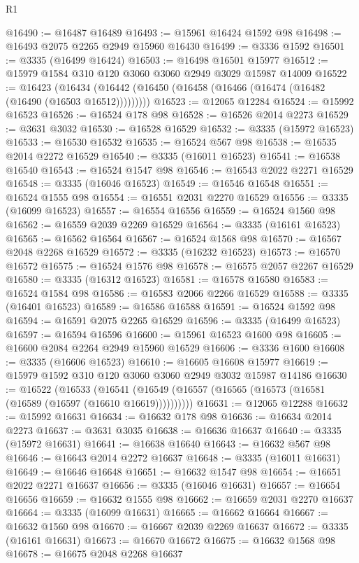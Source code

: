 \begin{lexlean}{R1}
\begin{coremodule}
@16490 := @16487 @16489
@16493 := @15961 @16424 @1592 @98
@16498 := @16493 @2075 @2265 @2949 @15960 @16430
@16499 := @3336 @1592
@16501 := @3335 (@16499 @16424)
@16503 := @16498 @16501 @15977
@16512 := @15979 @1584 @310 @120 @3060 @3060 @2949 @3029 @15987 @14009
@16522 := @16423
    (@16434 (@16442 (@16450 (@16458 (@16466 (@16474 (@16482 (@16490 (@16503 @16512)))))))))
@16523 := @12065 @12284
@16524 := @15992 @16523
@16526 := @16524 @178 @98
@16528 := @16526 @2014 @2273
@16529 := @3631 @3032
@16530 := @16528 @16529
@16532 := @3335 (@15972 @16523)
@16533 := @16530 @16532
@16535 := @16524 @567 @98
@16538 := @16535 @2014 @2272 @16529
@16540 := @3335 (@16011 @16523)
@16541 := @16538 @16540
@16543 := @16524 @1547 @98
@16546 := @16543 @2022 @2271 @16529
@16548 := @3335 (@16046 @16523)
@16549 := @16546 @16548
@16551 := @16524 @1555 @98
@16554 := @16551 @2031 @2270 @16529
@16556 := @3335 (@16099 @16523)
@16557 := @16554 @16556
@16559 := @16524 @1560 @98
@16562 := @16559 @2039 @2269 @16529
@16564 := @3335 (@16161 @16523)
@16565 := @16562 @16564
@16567 := @16524 @1568 @98
@16570 := @16567 @2048 @2268 @16529
@16572 := @3335 (@16232 @16523)
@16573 := @16570 @16572
@16575 := @16524 @1576 @98
@16578 := @16575 @2057 @2267 @16529
@16580 := @3335 (@16312 @16523)
@16581 := @16578 @16580
@16583 := @16524 @1584 @98
@16586 := @16583 @2066 @2266 @16529
@16588 := @3335 (@16401 @16523)
@16589 := @16586 @16588
@16591 := @16524 @1592 @98
@16594 := @16591 @2075 @2265 @16529
@16596 := @3335 (@16499 @16523)
@16597 := @16594 @16596
@16600 := @15961 @16523 @1600 @98
@16605 := @16600 @2084 @2264 @2949 @15960 @16529
@16606 := @3336 @1600
@16608 := @3335 (@16606 @16523)
@16610 := @16605 @16608 @15977
@16619 := @15979 @1592 @310 @120 @3060 @3060 @2949 @3032 @15987 @14186
@16630 := @16522
    (@16533 (@16541 (@16549 (@16557 (@16565 (@16573 (@16581 (@16589 (@16597 (@16610 @16619))))))))))
@16631 := @12065 @12288
@16632 := @15992 @16631
@16634 := @16632 @178 @98
@16636 := @16634 @2014 @2273
@16637 := @3631 @3035
@16638 := @16636 @16637
@16640 := @3335 (@15972 @16631)
@16641 := @16638 @16640
@16643 := @16632 @567 @98
@16646 := @16643 @2014 @2272 @16637
@16648 := @3335 (@16011 @16631)
@16649 := @16646 @16648
@16651 := @16632 @1547 @98
@16654 := @16651 @2022 @2271 @16637
@16656 := @3335 (@16046 @16631)
@16657 := @16654 @16656
@16659 := @16632 @1555 @98
@16662 := @16659 @2031 @2270 @16637
@16664 := @3335 (@16099 @16631)
@16665 := @16662 @16664
@16667 := @16632 @1560 @98
@16670 := @16667 @2039 @2269 @16637
@16672 := @3335 (@16161 @16631)
@16673 := @16670 @16672
@16675 := @16632 @1568 @98
@16678 := @16675 @2048 @2268 @16637

\end{coremodule}
\end{lexlean}
